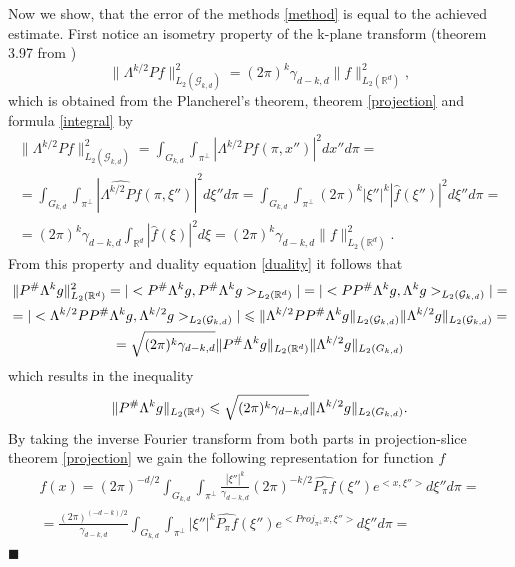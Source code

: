 \documentclass[12pt]{iopart}
\newenvironment{proof}
{\par\noindent{\bf Proof}}
{\hfill$\scriptstyle\blacksquare$}
\begin{document}
\begin{proof}
		Now we show, that the error of the methods \eqref{method} is equal to the achieved estimate. First notice an isometry property of the k-plane transform (theorem 3.97 from \cite{MA})
		$$\|\Lambda^{k/2}Pf\|^2_{L_2(\mathcal G_{k,d})}=(2\pi)^k\gamma_{d-k,d}\|f\|^2_{L_2(\mathbb R^d)},$$
		which is obtained from the Plancherel's theorem, theorem \ref{projection} and formula \eqref{integral} by    
		\begin{multline*}
		\|\Lambda^{k/2}Pf\|^2_{L_2(\mathcal G_{k,d})}=\int_{G_{k,d}}\int_{\pi^\perp}\left|\Lambda^{k/2}Pf(\pi,x'')\right|^2dx''d\pi=\\
		=\int_{G_{k,d}}\int_{\pi^\perp}\left|\widehat{\Lambda^{k/2}Pf}(\pi,\xi'')\right|^2d\xi''d\pi=\int_{G_{k,d}}\int_{\pi^\perp}(2\pi)^k|\xi''|^k\left|\widehat{f}(\xi'')\right|^2d\xi''d\pi=\\
		=(2\pi)^k\gamma_{d-k,d}\int_{\mathbb R^d}\left|\widehat{f}(\xi)\right|^2d\xi =(2\pi)^k\gamma_{d-k,d}\|f\|^2_{L_2(\mathbb R^d)}.
		\end{multline*}
		From this property and duality equation \eqref{duality} it follows that
		\begin{multline*}
		\|P^\#\Lambda^kg\|_{L_2(\mathbb R^d)}^2=|<P^\#\Lambda^kg,P^\#\Lambda^kg>_{L_2(\mathbb R^d)}|=|<PP^\#\Lambda^kg,\Lambda^kg>_{L_2(\mathcal G_{k,d})}|=\\
		=|<\Lambda^{k/2}PP^\#\Lambda^kg,\Lambda^{k/2}g>_{L_2(\mathcal G_{k,d})}|\leqslant\|\Lambda^{k/2}PP^\#\Lambda^kg\|_{L_2(\mathcal G_{k,d})}\|\Lambda^{k/2}g\|_{L_2(\mathcal G_{k,d})}=\\
		=\sqrt{(2\pi)^k\gamma_{d-k,d}}\|P^\#\Lambda^kg\|_{L_2(\mathbb R^d)}\|\Lambda^{k/2}g\|_{L_2(\mathbb \mathcal G_{k,d})}
		\end{multline*}
		which results in the inequality
		\begin{equation}
		\label{ineq}
		\|P^\#\Lambda^kg\|_{L_2(\mathbb R^d)}\leqslant\sqrt{(2\pi)^k\gamma_{d-k,d}}\|\Lambda^{k/2}g\|_{L_2(\mathbb \mathcal G_{k,d})}.
		\end{equation}
		By taking the inverse Fourier transform from both parts in projection-slice theorem \ref{projection} we gain the following representation for function $f$
		\begin{multline*}
		f(x) = (2\pi)^{-d/2}\int_{G_{k,d}}\int_{\pi^\perp}\frac{|\xi''|^k}{\gamma_{d-k,d}}(2\pi)^{-k/2}\widehat{P_\pi f}(\xi'')e^{<x,\xi''>}d\xi''d\pi = \\
		= \frac{(2\pi)^{(-d-k)/2}}{\gamma_{d-k,d}}\int_{G_{k,d}}\int_{\pi^\perp}|\xi''|^k\widehat{P_\pi f}(\xi'')e^{<Proj_{\pi^\perp}x,\xi''>}d\xi''d\pi = \\

\end{multline*}
\end{proof}
\end{document}
